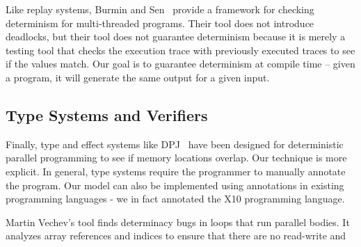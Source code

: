 Like replay systems, Burmin and Sen~\cite{Burnim2009asserting} provide a framework for
checking determinism for multi-threaded programs. Their tool does not
introduce deadlocks, but their tool does not guarantee determinism
because it is merely a testing tool that checks the execution trace
with previously executed traces to see if the values match. Our
goal is to guarantee determinism at compile time -- given a program,
it will generate the same output for a given input.



\subsection{Type Systems and Verifiers} 
 
Finally, type and effect systems like DPJ~\cite{bocchino2009type} 
 have been designed for deterministic parallel programming to see if
memory locations overlap. Our technique is more explicit. 
In general, type systems require the programmer to manually annotate the program. Our model can also be implemented using annotations in existing
programming languages - we in fact annotated the X10 programming language.

Martin Vechev's tool \cite{vechev2011automatic}
finds determinacy bugs in loops that run parallel bodies. It analyzes
array references and indices to ensure that there are no read-write and 

